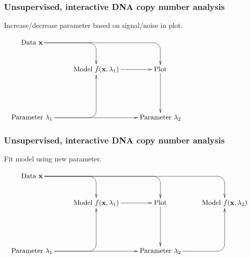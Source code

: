 \documentclass{beamer}
\begin{document}
\begin{frame}
  \frametitle{Unsupervised, interactive DNA copy number analysis}

  Increase/decrease parameter based on signal/noise in plot.
  
  \small

  \begin{displaymath}
  \xymatrix{
    \text{Data $\mathbf x$}
    \ar `[r] [dr] 
    \ar `r[rr] [drr] 
    & \text{ }
    & \text{ }
    & \text{ }
    \\
    & 
    \text{Model $f(\mathbf x, \lambda_1)$} 
    \ar [r]
    & 
    \text{Plot}
    \ar[dd]
    &
    \color{white}{ \text{Model $f(\mathbf x, \lambda_2)$} }
    \\
    & 
    &
    \\
    \text{Parameter $\lambda_1$} 
    \ar `r[ruu] [ruu]
    \ar [rr]
    & \text{ }
    & \text{Parameter $\lambda_2$}
  }
  \end{displaymath}
\end{frame}

\begin{frame}
  \frametitle{Unsupervised, interactive DNA copy number analysis}

  Fit model using new parameter.
  
  \small

  \begin{displaymath}
  \xymatrix{
    \text{Data $\mathbf x$}
    \ar `[r] [dr] 
    \ar `r[rr] [drr] 
    \ar `r[rrr] [drrr] 
    & \text{ }
    & \text{ }
    & \text{ }
    \\
    & 
    \text{Model $f(\mathbf x, \lambda_1)$} 
    \ar [r]
    & 
    \text{Plot}
    \ar[dd]
    &
    \text{Model $f(\mathbf x, \lambda_2)$} 
    \\
    & 
    &
    \\
    \text{Parameter $\lambda_1$} 
    \ar `r[ruu] [ruu]
    \ar [rr]
    & \text{ }
    & \text{Parameter $\lambda_2$}
    \ar `r[ruu] [ruu] 
  }
  \end{displaymath}
\end{frame}
\end{document}
